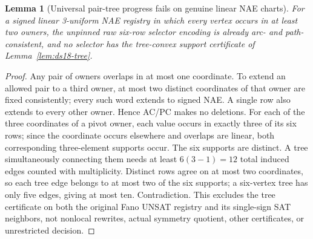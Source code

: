 \documentclass[11pt]{article}
\newtheorem{lemma}[theorem]{Lemma}
\begin{document}
\begin{lemma}[Universal pair-tree progress fails on genuine linear NAE charts]\label{lem:ds18-stall}
For a signed linear 3-uniform NAE registry in which every vertex occurs in at least two owners, the unpinned raw six-row selector encoding is already arc- and path-consistent, and no selector has the tree-convex support certificate of Lemma~\ref{lem:ds18-tree}.
\end{lemma}
\begin{proof}
Any pair of owners overlaps in at most one coordinate. To extend an allowed pair to a third owner, at most two distinct coordinates of that owner are fixed consistently; every such word extends to signed NAE. A single row also extends to every other owner. Hence AC/PC makes no deletions. For each of the three coordinates of a pivot owner, each value occurs in exactly three of its six rows; since the coordinate occurs elsewhere and overlaps are linear, both corresponding three-element supports occur. The six supports are distinct. A tree simultaneously connecting them needs at least $6(3-1)=12$ total induced edges counted with multiplicity. Distinct rows agree on at most two coordinates, so each tree edge belongs to at most two of the six supports; a six-vertex tree has only five edges, giving at most ten. Contradiction. This excludes the tree certificate on both the original Fano UNSAT registry and its single-sign SAT neighbors, not nonlocal rewrites, actual symmetry quotient, other certificates, or unrestricted decision.
\end{proof}
\end{document}
